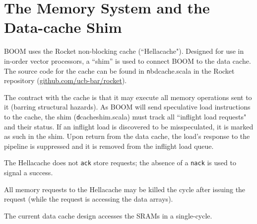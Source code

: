 
\chapter{The Memory System and the Data-cache Shim}

BOOM uses the Rocket non-blocking cache (``Hellacache").  Designed for use in in-order vector processors, a ``shim'' is used to connect BOOM to the data cache. The source code for the cache can be found in {\texttt nbdcache.scala} in the Rocket repository (\url{github.com/ucb-bar/rocket}). 

The contract with the cache is that it may execute all memory operations sent to it (barring structural hazards).  As BOOM will send speculative load instructions to the cache, the shim ({\texttt dcacheshim.scala})  must track all ``inflight load requests" and their status. If an inflight load is discovered to be misspeculated, it is marked as such in the shim.  Upon return from the data cache, the load's response to the pipeline is suppressed and it is removed from the inflight load queue. 

The Hellacache does not {\tt ack} store requests; the absence of a {\tt nack} is used to signal a success. 

All memory requests to the Hellacache may be killed the cycle after issuing the request (while the request is accessing the data arrays).  

The current data cache design accesses the SRAMs in a single-cycle. 
